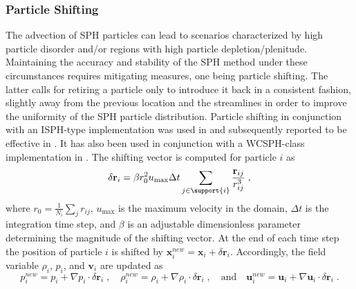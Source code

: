\subsubsection{Particle Shifting}\label{subsec:Par_Shift}  %
The advection of SPH particles can lead to scenarios characterized by high particle disorder and/or regions with high particle depletion/plenitude. Maintaining the accuracy and stability of the SPH method under these circumstances requires mitigating measures, one being particle shifting. The latter calls for retiring a particle only to introduce it back in a consistent fashion, slightly away from the previous location and the streamlines in order to improve the uniformity of the SPH particle distribution. Particle shifting in conjunction with an ISPH-type implementation was used in \cite{Xu2009Accuracy} and subsequently reported to be effective in \cite{Trask2015}. It has also been used in conjunction with a WCSPH-class implementation in \cite{Shadloo2012Robust}. The shifting vector is computed for particle $i$ as
\begin{equation*}
\delta \textbf{r}_{i} = \beta r_0^2 u_\mathrm{max} \Delta t\sum\limits_{j \in \support{i}}  \frac{\textbf{r}_{ij}}{r_{ij}^3} \; ,
\end{equation*}
where $r_0=\frac{1}{N_i}\sum\limits_j  {r_{ij}}$, $u_\mathrm{max}$ is the maximum velocity in the domain, $\Delta t$ is the integration time step, and $\beta$ is an adjustable dimensionless parameter determining the magnitude of the shifting vector. At the end of each time step the position of particle $i$ is shifted by $\textbf{x}_{i}^{new} = \textbf{x}_{i} + \delta \textbf{r}_{i}$. Accordingly, the field variable $\rho_{i}$, $p_{i}$, and $\textbf{v}_{i}$ are updated as 
\begin{equation*}
p_{i}^{new} = p_{i} + \nabla p_{i}\cdot \delta \textbf{r}_{i} \; , \quad
\rho_{i}^{new} = \rho_{i} + \nabla \rho_{i}\cdot \delta \textbf{r}_{i} \;, \quad \mbox{and} \quad
\mathbf{u}_{i}^{new} = \mathbf{u}_{i} + \nabla \mathbf{u}_{i}\cdot \delta \textbf{r}_{i} \; .
\end{equation*}

